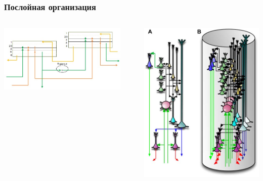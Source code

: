 \documentclass[default]{beamer}
\begin{document}
	\begin{frame}
		\frametitle{Послойная организация}
		
		\begin{columns}
			\begin{column}{0.65\textwidth}
				\includegraphics[width=0.9\textwidth]{regions_connect}
			\end{column}
			\begin{column}{0.35\textwidth}
				\includegraphics[width=\textwidth]{column}
			\end{column}
		\end{columns}
	\end{frame}
\end{document}
